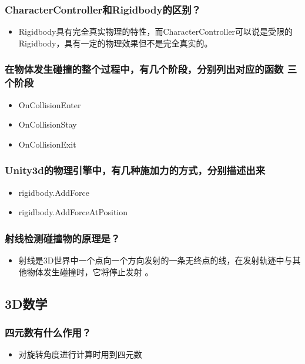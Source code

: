 \documentclass[9pt, b5paper]{article}
\begin{document}
\subsubsection{CharacterController和Rigidbody的区别？}
\label{sec:org5532380}
\begin{itemize}
\item Rigidbody具有完全真实物理的特性，而CharacterController可以说是受限的Rigidbody，具有一定的物理效果但不是完全真实的。
\end{itemize}

\subsubsection{在物体发生碰撞的整个过程中，有几个阶段，分别列出对应的函数 三个阶段}
\label{sec:orgff58b8e}
\begin{itemize}
\item OnCollisionEnter
\item OnCollisionStay
\item OnCollisionExit
\end{itemize}
\subsubsection{Unity3d的物理引擎中，有几种施加力的方式，分别描述出来}
\label{sec:org8103a26}
\begin{itemize}
\item rigidbody.AddForce
\item rigidbody.AddForceAtPosition
\end{itemize}

\subsubsection{射线检测碰撞物的原理是？}
\label{sec:orgd17e46a}
\begin{itemize}
\item 射线是3D世界中一个点向一个方向发射的一条无终点的线，在发射轨迹中与其他物体发生碰撞时，它将停止发射 。
\end{itemize}


\subsection{3D数学}
\label{sec:org6ba1464}
\subsubsection{四元数有什么作用？}
\label{sec:orge358b4a}
\begin{itemize}
\item 对旋转角度进行计算时用到四元数
\end{itemize}
\end{document}
